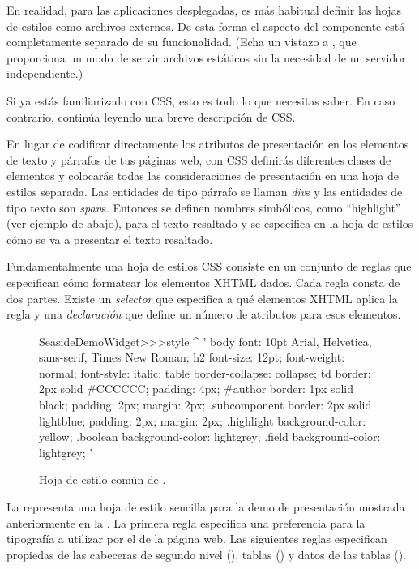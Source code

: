 \documentclass[a4paper,10pt,twoside]{book}
\begin{document}
En realidad, para las aplicaciones desplegadas, es más habitual definir las hojas de estilos como archivos externos.
De esta forma el aspecto del componente está completamente separado de su funcionalidad.
(Echa un vistazo a , que proporciona un modo de servir archivos estáticos sin la necesidad de un servidor independiente.)

Si ya estás familiarizado con CSS, esto es todo lo que necesitas saber.
En caso contrario, continúa leyendo una breve descripción de CSS.

En lugar de codificar directamente los atributos de presentación en los elementos de texto y párrafos de tus páginas web, con CSS definirás diferentes clases de elementos y colocarás todas las consideraciones de presentación en una hoja de estilos separada.
Las entidades de tipo párrafo se llaman \emph{div}s y las entidades de tipo texto son \emph{span}s. 
Entonces se definen nombres simbólicos, como ``highlight'' (ver ejemplo de abajo), para el texto resaltado y se especifica en la hoja de estilos cómo se va a presentar el texto resaltado.

Fundamentalmente una hoja de estilos CSS consiste en un conjunto de reglas que especifican cómo formatear los elementos XHTML dados.
Cada regla consta de dos partes.
Existe un \emph{selector} que especifica a qué elementos XHTML aplica la regla y una \emph{declaración} que define un número de atributos para esos elementos.

\begin{figure}[tb]
\begin{code}{}
SeasideDemoWidget>>>style
	^ '
body {
	font: 10pt Arial, Helvetica, sans-serif, Times New Roman;
}
h2 {
	font-size: 12pt;
	font-weight: normal;
	font-style: italic;
}
table { border-collapse: collapse; }
td {
	border: 2px solid #CCCCCC;
	padding: 4px;
}
#author {
	border: 1px solid black;
	padding: 2px;
	margin: 2px;
}
.subcomponent {
	border: 2px solid lightblue;
	padding: 2px;
	margin: 2px;
}
.highlight { background-color: yellow; }
.boolean { background-color: lightgrey; }
.field { background-color: lightgrey; }
'
\end{code}
\caption{Hoja de estilo común de .
}
\end{figure}

La  representa una hoja de estilo sencilla para la demo de presentación mostrada anteriormente en la .
La primera regla especifica una preferencia para la tipografía a utilizar por el  de la página web.
Las siguientes reglas especifican propiedas de las cabeceras de segundo nivel (), tablas () y datos de las tablas ().
\end{document}
